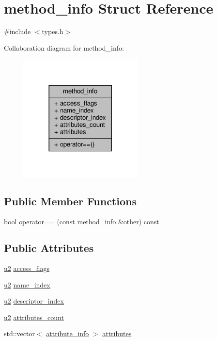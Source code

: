\hypertarget{structmethod__info}{}\section{method\+\_\+info Struct Reference}
\label{structmethod__info}


{\ttfamily \#include $<$types.\+h$>$}



Collaboration diagram for method\+\_\+info\+:\nopagebreak
\begin{figure}[H]
\begin{center}
\leavevmode
\includegraphics[width=177pt]{structmethod__info__coll__graph}
\end{center}
\end{figure}
\subsection*{Public Member Functions}
\begin{DoxyCompactItemize}
\item 
bool \hyperlink{structmethod__info_ab54ed16ea03e7462cb0ec395bb3a88c3}{operator==} (const \hyperlink{structmethod__info}{method\+\_\+info} \&other) const
\end{DoxyCompactItemize}
\subsection*{Public Attributes}
\begin{DoxyCompactItemize}
\item 
\hyperlink{types_8h_ae676e9207f57fb921dca7366b2f59c53}{u2} \hyperlink{structmethod__info_a3b657027a141cdbc94ded28607c98be5}{access\+\_\+flags}
\item 
\hyperlink{types_8h_ae676e9207f57fb921dca7366b2f59c53}{u2} \hyperlink{structmethod__info_ab91d62d0658b77bba83f6bb685e3bbb9}{name\+\_\+index}
\item 
\hyperlink{types_8h_ae676e9207f57fb921dca7366b2f59c53}{u2} \hyperlink{structmethod__info_a7713103e0c8d060630ad62774fb9be37}{descriptor\+\_\+index}
\item 
\hyperlink{types_8h_ae676e9207f57fb921dca7366b2f59c53}{u2} \hyperlink{structmethod__info_ad9e5e1e2fc850806addadd6deab8565d}{attributes\+\_\+count}
\item 
std\+::vector$<$ \hyperlink{structattribute__info}{attribute\+\_\+info} $>$ \hyperlink{structmethod__info_a9bb84cae294f305b50714fd849f31f7e}{attributes}
\end{DoxyCompactItemize}


